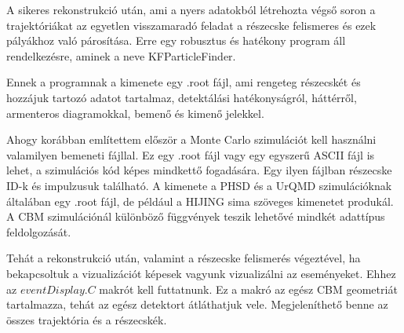 \documentclass[a4paper,12pt]{article}
\begin{document}
\par A sikeres rekonstrukció után, ami a nyers adatokból létrehozta végső soron a trajektóriákat az egyetlen visszamaradó feladat a részecske felismeres és ezek pályákhoz való párosítása. Erre egy robusztus és hatékony program áll rendelkezésre, aminek a neve KFParticleFinder.
\par Ennek a programnak a kimenete egy .root fájl, ami rengeteg részecskét és hozzájuk tartozó adatot tartalmaz, detektálási hatékonyságról, háttérről, armenteros diagramokkal, bemenő és kimenő jelekkel.
\par Ahogy korábban említettem először a Monte Carlo szimulációt kell használni valamilyen bemeneti fájllal. Ez egy .root fájl vagy egy egyszerű ASCII fájl is lehet, a szimulációs kód képes mindkettő fogadására. Egy ilyen fájlban részecske ID-k és impulzusuk található. A kimenete 
a PHSD és a UrQMD szimulációknak általában egy .root fájl, de például a HIJING sima szöveges kimenetet produkál. A CBM szimulációnál különböző függvények teszik lehetővé mindkét adattípus feldolgozását.
\par Tehát a rekonstrukció után, valamint a részecske felismerés végeztével, ha bekapcsoltuk a vizualizációt képesek vagyunk vizualizálni az eseményeket. Ehhez az $eventDisplay.C$ makrót kell futtatnunk. Ez a makró az egész CBM geometriát tartalmazza, tehát az egész 
detektort átláthatjuk vele. Megjeleníthető benne az összes trajektória és a részecskék.
\end{document}
